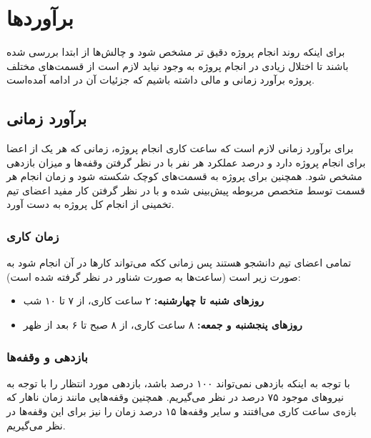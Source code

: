 \chapter{برآوردها}
برای اینکه روند انجام پروژه دقیق تر مشخص شود و چالش‌ها از ابتدا بررسی شده باشند تا اختلال زیادی در انجام پروژه به وجود نیاید لازم است از قسمت‌های مختلف پروژه برآورد زمانی و مالی داشته باشیم که جزئیات آن در ادامه آمده‌است.
\section{برآورد زمانی}
برای برآورد زمانی لازم است که ساعت کاری انجام پروژه، زمانی که هر یک از اعضا برای انجام پروژه دارد و درصد عملکرد هر نفر با در نظر گرفتن وقفه‌ها و میزان بازدهی مشخص شود. 
همچنین برای پروژه به قسمت‌های کوچک شکسته شود و زمان انجام هر قسمت توسط متخصص مربوطه پیش‌بینی شده و با در نظر گرفتن کار مفید اعضای تیم تخمینی از انجام کل پروژه به دست آورد. 

\subsection{زمان کاری}
تمامی اعضای تیم دانشجو هستند پس زمانی ککه می‌تواند کار‌ها در آن انجام شود به صورت زیر است (ساعت‌ها به صورت شناور در نظر گرفته شده است):

\begin{itemize}
	\item
	\textbf{روزهای شنبه تا چهارشنبه:}
	۲ ساعت کاری، از ۷ تا ۱۰ شب
	\item 
	\textbf{روزهای پنجشنبه و جمعه:}
	۸ ساعت کاری، از ۸ صبح تا ۶ بعد از ظهر 
\end{itemize}

\subsection{بازدهی و وقفه‌ها}
با توجه به اینکه بازدهی نمی‌تواند ۱۰۰ درصد باشد، بازدهی مورد انتظار را با توجه به نیرو‌های موجود ۷۵ درصد در نظر می‌گیریم. همچنین وقفه‌هایی مانند زمان ناهار که بازه‌ی ساعت کاری می‌افتند و سایر وقفه‌ها ۱۵ درصد زمان را نیز برای این وقفه‌ها در نظر می‌گیریم.
